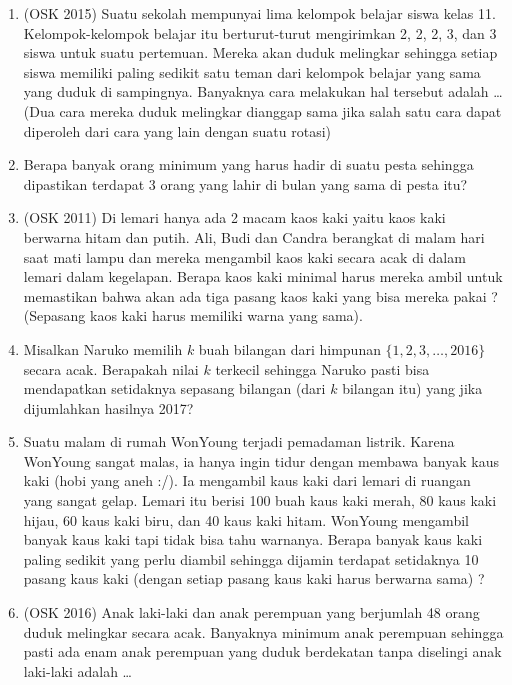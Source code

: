 \documentclass[12pt]{scrartcl}
\begin{document}
\begin{enumerate}
    \item (OSK 2015) Suatu sekolah mempunyai lima kelompok belajar siswa kelas 11. Kelompok-kelompok belajar itu berturut-turut mengirimkan 2, 2, 2, 3, dan 3 siswa untuk suatu pertemuan. Mereka akan duduk melingkar sehingga setiap siswa memiliki paling sedikit satu teman dari kelompok belajar yang sama yang duduk di sampingnya. Banyaknya cara melakukan hal tersebut adalah \ldots\\
    (Dua cara mereka duduk melingkar dianggap sama jika salah satu cara dapat diperoleh dari cara yang lain dengan suatu rotasi)

    \item Berapa banyak orang minimum yang harus hadir di suatu pesta sehingga dipastikan terdapat 3 orang yang lahir di bulan yang sama di pesta itu?

    \item (OSK 2011) Di lemari hanya ada 2 macam kaos kaki yaitu kaos kaki berwarna hitam dan putih. Ali, Budi dan Candra berangkat di malam hari saat mati lampu dan mereka mengambil kaos kaki secara acak di dalam lemari dalam kegelapan. Berapa kaos kaki minimal harus mereka ambil untuk memastikan bahwa akan ada tiga pasang kaos kaki yang bisa mereka pakai ? (Sepasang kaos kaki harus memiliki warna yang sama).

    \item Misalkan Naruko memilih $k$ buah bilangan dari himpunan $\{1,2,3,\dots,2016\}$ secara acak. Berapakah nilai $k$ terkecil sehingga Naruko pasti bisa mendapatkan setidaknya sepasang bilangan (dari $k$ bilangan itu) yang jika dijumlahkan hasilnya 2017?
    
    \item Suatu malam di rumah WonYoung terjadi pemadaman listrik. Karena WonYoung sangat malas, ia hanya ingin tidur dengan membawa banyak kaus kaki (hobi yang aneh :/). Ia mengambil kaus kaki dari lemari di ruangan yang sangat gelap. Lemari itu berisi 100 buah kaus kaki merah, 80 kaus kaki hijau, 60 kaus kaki biru, dan 40 kaus kaki hitam. WonYoung mengambil banyak kaus kaki tapi tidak bisa tahu warnanya. Berapa banyak kaus kaki paling sedikit yang perlu diambil sehingga dijamin terdapat setidaknya 10 pasang kaus kaki (dengan setiap pasang kaus kaki harus berwarna sama) ?
    
    \item (OSK 2016) Anak laki-laki dan anak perempuan yang berjumlah 48 orang duduk melingkar secara acak. Banyaknya minimum anak perempuan sehingga pasti ada enam anak perempuan yang duduk berdekatan tanpa diselingi anak laki-laki adalah \dots
\end{enumerate}
\end{document}
